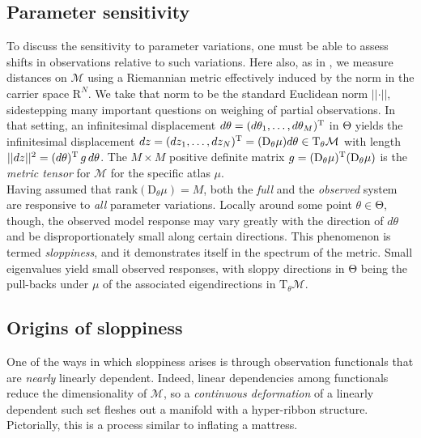 \documentclass{article}
\newcommand{\D}{\mathrm{D}}
\newcommand{\norm}[1]{\vert\vert#1\vert\vert}
\newcommand{\p}{\theta}
\newcommand{\omr}{\mu}
\newcommand{\omm}{\mathcal{M}}
\newcommand{\R}{\mathrm{R}}
\newcommand{\ps}{\mathrm{\Theta}}
\begin{document}
\subsection{Parameter sensitivity}
%
To discuss the sensitivity to parameter variations, one must be able
to assess shifts in observations relative to such variations.  Here
also, as in \cite{TMS11}, we measure distances on $\omm$ using a
Riemannian metric effectively induced by the norm in the carrier space
$\R^N$.  We take that norm to be the standard Euclidean norm
$\norm{\cdot}$, sidestepping many important questions on weighing of
partial observations.  In that setting, an infinitesimal displacement
$d\p = (d\p_1 , \ldots , d\p_M)^{\rm T}$ in $\ps$ yields the
infinitesimal displacement
$dz = (dz_1 , \ldots , dz_N)^{\rm T} = (\D_\p\mu) d\p \in
\mathrm{T}_\p\omm$
with length $\norm{dz}^2 = (d\p)^{\rm T} \, g \, d\p$.  The
$M \times M$ positive definite matrix
$g = (\D_\p\omr)^{\rm T}(\D_\p\omr)$ is the \emph{metric tensor} for
$\omm$
for the specific atlas $\omr$.\\

Having assumed that $\mathrm{ rank}(\D_\p \omr) = M$, both the
\emph{full} and the \emph{observed} system are responsive to
\emph{all} parameter variations.  Locally around some point
$\p \in \ps$, though, the observed model response may vary greatly
with the direction of $d\p$ and be disproportionately small along
certain directions.  This phenomenon is termed \emph{sloppiness}, and
it demonstrates itself in the spectrum of the metric.  Small
eigenvalues yield small observed responses, with sloppy directions in
$\ps$ being the pull-backs under $\mu$ of the associated
eigendirections in $\mathrm{T}_\p\omm$.

\subsection{Origins of sloppiness}
%
One of the ways in which sloppiness arises is through observation
functionals that are \emph{nearly} linearly dependent.  Indeed, linear
dependencies among functionals reduce the dimensionality of $\omm$, so
a \emph{continuous deformation} of a linearly dependent such set
fleshes out a manifold with a hyper-ribbon structure.
Pictorially, this is a process similar to inflating a mattress.\\
\end{document}
